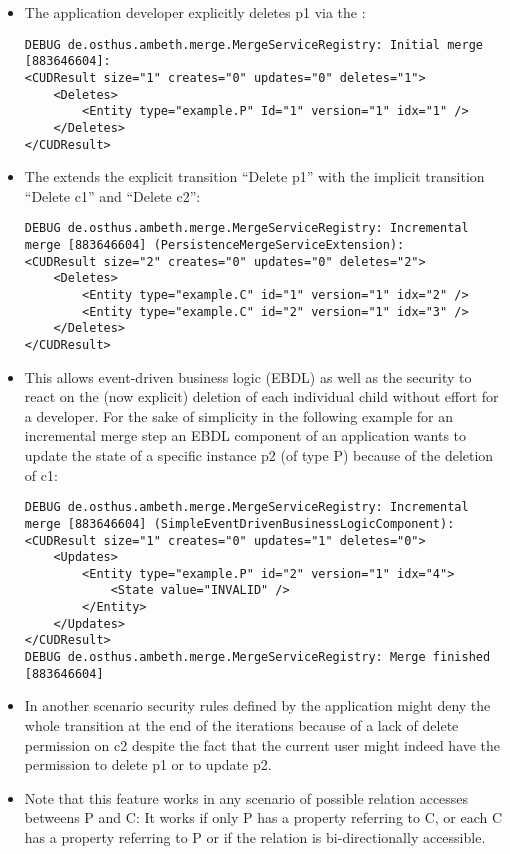 \begin{enumerate}
\begin{itemize}
			\item The application developer explicitly deletes p1 via the \AMBETH{} :
\begin{lstlisting}[style=POM]
DEBUG de.osthus.ambeth.merge.MergeServiceRegistry: Initial merge [883646604]:
<CUDResult size="1" creates="0" updates="0" deletes="1">
	<Deletes>
		<Entity type="example.P" Id="1" version="1" idx="1" />
	</Deletes>
</CUDResult>
\end{lstlisting}
			\item The  extends the explicit transition ``Delete p1'' with the implicit transition ``Delete c1'' and ``Delete c2'':
\begin{lstlisting}[style=POM]		
DEBUG de.osthus.ambeth.merge.MergeServiceRegistry: Incremental merge [883646604] (PersistenceMergeServiceExtension):
<CUDResult size="2" creates="0" updates="0" deletes="2">
	<Deletes>
		<Entity type="example.C" id="1" version="1" idx="2" />
		<Entity type="example.C" id="2" version="1" idx="3" />
	</Deletes>
</CUDResult>
\end{lstlisting}			
			\item This allows event-driven business logic (EBDL) as well as the \AMBETH{} security to react on the (now explicit) deletion of each individual child without  effort for a developer. For the sake of simplicity in the following example for an incremental merge step an EBDL component of an application wants to update the state of a specific instance p2 (of type P) because of the deletion of c1:
\begin{lstlisting}[style=POM]		
DEBUG de.osthus.ambeth.merge.MergeServiceRegistry: Incremental merge [883646604] (SimpleEventDrivenBusinessLogicComponent):
<CUDResult size="1" creates="0" updates="1" deletes="0">
	<Updates>
		<Entity type="example.P" id="2" version="1" idx="4">
			<State value="INVALID" />
		</Entity>
	</Updates>
</CUDResult>
DEBUG de.osthus.ambeth.merge.MergeServiceRegistry: Merge finished [883646604]
\end{lstlisting}
			\item In another scenario security rules defined by the application might deny the whole transition at the end of the  iterations because of a lack of delete permission on c2 despite the fact that the current user might indeed have the permission to delete p1 or to update p2.
			\item Note that this feature works in any scenario of possible relation accesses betweens P and C: It works if only P has a property referring to C, or each C has a property referring to P or if the relation is bi-directionally accessible.

\end{itemize}
\end{enumerate}
